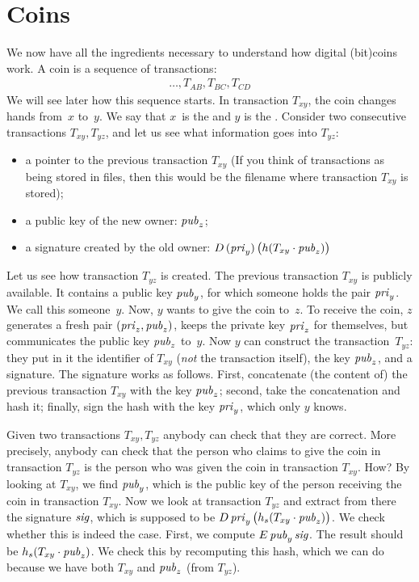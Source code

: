 \section{Coins}\label{sec:bitcoin-coin}

We now have all the ingredients necessary to understand how digital (bit)coins work.
A coin is a sequence of transactions:
\begin{align*}
  \ldots,
  T_{AB},
  T_{BC},
  T_{CD}
\end{align*}
We will see later how this sequence starts.
In transaction $T_{xy}$, the coin changes hands from~$x$ to~$y$.
We say that $x$~is the  and $y$ is the .
Consider two consecutive transactions $T_{xy},T_{yz}$, and let us see what information goes into $T_{yz}$:
\begin{itemize}
\item a pointer to the previous transaction $T_{xy}$
  (If you think of transactions as being stored in files, then this would be the filename where transaction $T_{xy}$ is stored);
\item a public key of the new owner: ${\it pub}_z$;
\item a signature created by the old owner:
  $D\,({\it pri}_y)\,\bigl(h(T_{xy}\cdot{\it pub}_z)\bigr)$
\end{itemize}

Let us see how transaction $T_{yz}$ is created.
The previous transaction $T_{xy}$ is publicly available.
It contains a public key ${\it pub}_y$, for which someone holds the pair ${\it pri}_y$.
We call this someone~$y$.
Now, $y$ wants to give the coin to~$z$.
To receive the coin, $z$ generates a fresh pair $({\it pri}_z,{\it pub}_z)$, keeps the private key ${\it pri}_z$ for themselves, but communicates the public key ${\it pub}_z$ to~$y$.
Now $y$ can construct the transaction~$T_{yz}$: they put in it
  the identifier of $T_{xy}$ (\emph{not} the transaction itself),
  the key ${\it pub}_z$,
  and a signature.
The signature works as follows.
First, concatenate (the content of) the previous transaction $T_{xy}$ with the key ${\it pub}_z$;
second, take the concatenation and hash it;
finally, sign the hash with the key ${\it pri}_y$, which only $y$ knows.

Given two transactions $T_{xy},T_{yz}$ anybody can check that they are correct.
More precisely, anybody can check that the person who claims to give the coin in transaction $T_{yz}$ is the person who was given the coin in transaction $T_{xy}$.
How?
By looking at $T_{xy}$, we find ${\it pub}_y$, which is the public key of the person receiving the coin in transaction $T_{xy}$.
Now we look at transaction $T_{yz}$ and extract from there the signature ${\it sig}$, which is supposed to be $D\,{\it pri}_y\,\bigl(h_s(T_{xy}\cdot{\it pub}_z)\bigr)$.
We check whether this is indeed the case.
First, we compute $E\,{\it pub}_y\,{\it sig}$.
The result should be $h_s(T_{xy}\cdot{\it pub}_z)$.
We check this by recomputing this hash, which we can do because we have both $T_{xy}$ and ${\it pub}_z$ (from $T_{yz}$).



